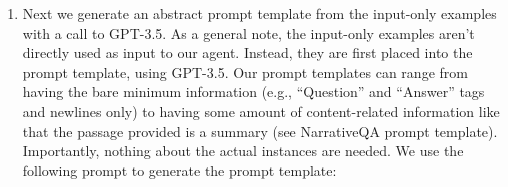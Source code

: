 \begin{enumerate}
\begin{figure}[htbp]
{{\begin{alltt}
] 
\end{alltt} 
}} 
\end{figure}
    \item Next we generate an abstract prompt template from the input-only examples with a call to GPT-3.5. As a general note, the input-only examples aren’t directly used as input to our agent. Instead, they are first placed into the prompt template, using GPT-3.5. Our prompt templates can range from having the bare minimum information (e.g., “Question” and “Answer” tags and newlines only) to having some amount of content-related information like that the passage provided is a summary (see NarrativeQA prompt template). Importantly, nothing about the actual instances are needed. We use the following prompt to generate the prompt template:
\begin{figure}[htbp]
\centering
\scriptsize
\setlength{\fboxsep}{1em}
\setlength{\fboxrule}{1pt}
\end{figure}


\end{enumerate}

